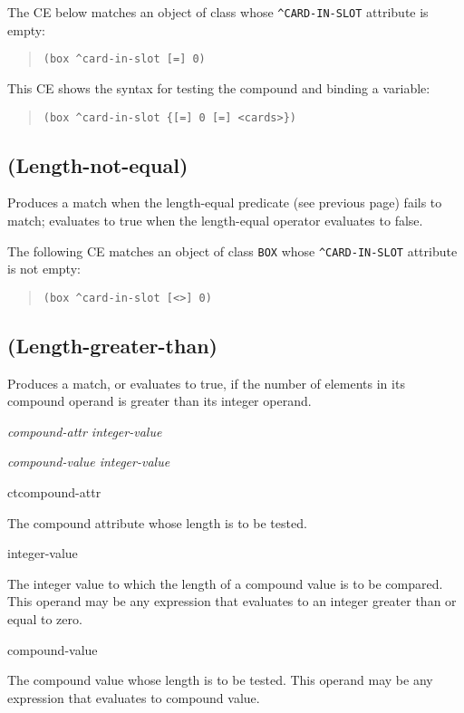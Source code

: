 \Example

The CE below matches an object of class  whose
\verb|^CARD-IN-SLOT| attribute is empty:

\begin{quote}
\begin{verbatim}
(box ^card-in-slot [=] 0)
\end{verbatim}
\end{quote}

This CE shows the syntax for testing the compound and binding a
variable:

\begin{quote}
\begin{verbatim}
(box ^card-in-slot {[=] 0 [=] <cards>})
\end{verbatim}
\end{quote}

\subsection{\co{[<>]} (Length-not-equal)}

Produces a match when the length-equal predicate (see previous page)
fails to match; evaluates to true when the length-equal operator
evaluates to false.

\Example

The following CE matches an object of class \verb|BOX| whose
\verb|^CARD-IN-SLOT| attribute is not empty:

\begin{quote}
\begin{verbatim}
(box ^card-in-slot [<>] 0)
\end{verbatim}
\end{quote}

\subsection{\co{[>]} (Length-greater-than)}

Produces a match, or evaluates to true, if the number of elements in
its compound operand is greater than its integer operand.

\Format

\ct\it{compound-attr} \co{[>]} \it{integer-value}

\it{compound-value} \co{[>]} \it{integer-value}

\begin{operands}
\item[ct{compound-attr}]

  The compound attribute whose length is to be tested.

\item[integer-value]

  The integer value to which the length of a compound value is to be
  compared. This operand may be any expression that evaluates to an
  integer greater than or equal to zero.

\item[compound-value]

  The compound value whose length is to be tested. This operand may be
  any expression that evaluates to compound value.
\end{operands}

